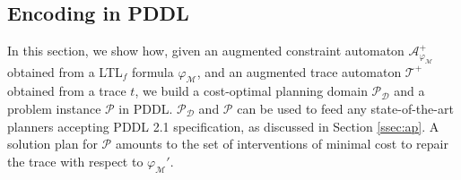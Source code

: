 \subsection{Encoding in PDDL}\label{ssec:eip}

\newcommand{\myi}{\emph{(i)}\xspace}
\newcommand{\myii}{\emph{(ii)}\xspace}
\newcommand{\myiii}{\emph{(iii)}\xspace}
\newcommand{\myiv}{\emph{(iv)}\xspace}
\newcommand{\myv}{\emph{(v)}\xspace}
\newcommand{\myvi}{\emph{(vi)}\xspace}
\newcommand{\A}{\mathcal{A}}
\newcommand{\T}{\mathcal{T}}
\newcommand{\PDDL}[1]{\begin{footnotesize}\texttt{#1}\end{footnotesize}}

\sloppypar

In this section, we show how, given an augmented constraint automaton $\mathcal{A}_{\varphi_{\mathcal{M}}}^+$ obtained from a LTL$_f$ formula  $\varphi_{\mathcal{M}}$, and an augmented trace automaton $\T^+$ obtained from a trace $t$, we build a cost-optimal planning domain $\mathcal{P_D}$ and a problem instance $\mathcal{P}$ in PDDL. $\mathcal{P_D}$ and $\mathcal{P}$ can be used to feed any state-of-the-art planners accepting PDDL 2.1 specification, as discussed in Section \ref{ssec:ap}.
%
A solution plan for $\mathcal{P}$ amounts to the set of interventions of minimal cost to repair the trace with respect to $\varphi_{\mathcal{M}}'$.

